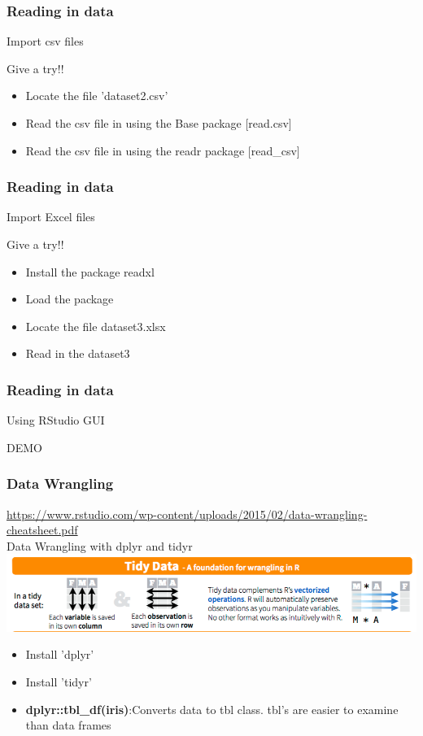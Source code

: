 \documentclass{beamer}
\begin{document}
\begin{frame}[fragile]
	\frametitle{Reading in data}
	\centering \Large Import csv files

	\centering \normalsize Give a try!!
	\begin{itemize}
		\small
		\item Locate the file 'dataset2.csv'
		\item Read the csv file in using the Base package [read.csv]
		\item Read the csv file in using the readr package [read\_csv]
	\end{itemize}
\end{frame}

\begin{frame}[fragile]
	\frametitle{Reading in data}
	\centering \Large Import Excel files

	\centering \normalsize Give a try!!
	\begin{itemize}
		\small
		\item Install the package readxl
		\item Load the package
		\item Locate the file dataset3.xlsx
		\item Read in the dataset3
	\end{itemize}
\end{frame}

\begin{frame}[fragile]
	\frametitle{Reading in data}
	\centering \Large Using RStudio GUI
	\vspace{40pt}

	\begin{center}	\Huge DEMO \end{center}
\end{frame}

\begin{frame}[fragile]
	\frametitle{Data Wrangling}
	\centering \tiny \url{https://www.rstudio.com/wp-content/uploads/2015/02/data-wrangling-cheatsheet.pdf}\\
	\centering \Large Data Wrangling with dplyr and tidyr\\
	\vspace{10pt}
	\includegraphics{figures/dp1.png}

	\begin{itemize}
	\small
		\pause
		\item Install 'dplyr'
		\item Install 'tidyr'
	\item \textbf{dplyr::tbl\_df(iris)}:Converts data to tbl class. tbl's are easier to examine than data frames


\end{itemize}
\end{frame}
\end{document}

